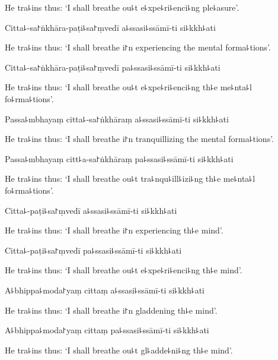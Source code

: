 \begin{english}
  He tra꜕ins thus: `I shall breathe ou꜕t e꜕xpe꜕ri꜕enci꜕ng ple꜕asure'.
\end{english}

Citta꜕-sa꜓ṅkhāra-paṭi꜕sa꜓ṃvedī a꜕ssasi꜕ssāmī-ti si꜕kkh꜕ati

\begin{english}
  He tra꜕ins thus: `I shall breathe i꜓n experiencing the mental forma꜕tions'.
\end{english}

Citta꜕-sa꜓ṅkhāra-paṭi꜕sa꜓ṃvedī pa꜕ssasi꜕ssāmī-ti si꜕kkh꜕ati

\begin{english}
  He tra꜕ins thus: `I shall breathe ou꜕t e꜕xpe꜕ri꜕enci꜕ng th꜕e me꜕nta꜕l fo꜕rma꜕tions'.
\end{english}

Passa꜕mbhayaṃ citta꜕-sa꜓ṅkhāraṃ a꜕ssasi꜕ssāmī-ti si꜕kkh꜕ati

\begin{english}
  He tra꜕ins thus: `I shall breathe i꜓n tranquillizing the mental forma꜕tions'.
\end{english}

Passa꜕mbhayaṃ citt꜕a-sa꜓ṅkhāraṃ pa꜕ssasi꜕ssāmī-ti si꜕kkh꜕ati

\begin{english}
  He tra꜕ins thus: `I shall breathe ou꜕t tra꜕nqu꜕ill꜕izi꜕ng th꜕e me꜕nta꜕l fo꜕rma꜕tions'.
\end{english}

Citta꜕-paṭi꜕sa꜓ṃvedī a꜕ssasi꜕ssāmī-ti si꜕kkh꜕ati

\begin{english}
  He tra꜕ins thus: `I shall breathe i꜓n experiencing th꜕e mind'.
\end{english}

Citta꜕-paṭi꜕sa꜓ṃvedī pa꜕ssasi꜕ssāmī-ti si꜕kkh꜕ati

\begin{english}
  He tra꜕ins thus: `I shall breathe ou꜕t e꜕xpe꜕ri꜕enci꜕ng th꜕e mind'.
\end{english}

A꜕bhippa꜕moda꜓yaṃ cittaṃ a꜕ssasi꜕ssāmī-ti si꜕kkh꜕ati

\begin{english}
  He tra꜕ins thus: `I shall breathe i꜓n gladdening th꜕e mind'.
\end{english}

A꜕bhippa꜕moda꜓yaṃ cittaṃ pa꜕ssasi꜕ssāmī-ti si꜕kkh꜕ati

\begin{english}
  He tra꜕ins thus: `I shall breathe ou꜕t gl꜕adde꜕ni꜕ng th꜕e mind'.
\end{english}

